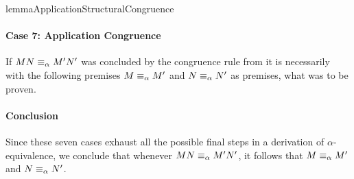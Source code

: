 \begin{longproof}{lemmaApplicationStructuralCongruence}
\paragraph{Case 7: Application Congruence}
If $MN \equiv_\alpha M'N'$ was concluded by the congruence rule from it is necessarily with the following premises $M \equiv_\alpha M'$ and $N \equiv_\alpha N'$ as premises, what was to be proven.

\paragraph{Conclusion}
Since these seven cases exhaust all the possible final steps in a derivation 
of $\alpha$-equivalence, we conclude that whenever $M N \equiv_\alpha M' N'$, it 
follows that $M \equiv_\alpha M'$ and $N \equiv_\alpha N'$.
\end{longproof}

%
%

